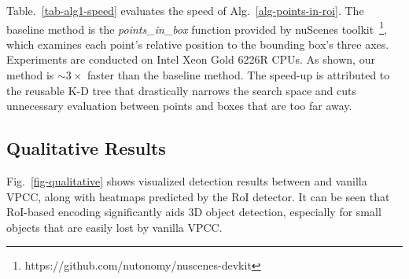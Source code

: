 Table.~\ref{tab-alg1-speed} evaluates the speed of Alg.~\ref{alg-points-in-roi}. 
The baseline method is the \textit{points\_in\_box} function provided by nuScenes 
toolkit~\footnote{https://github.com/nutonomy/nuscenes-devkit}, 
which examines each point's relative position to the bounding box's three axes.
Experiments are conducted on Intel Xeon Gold 6226R CPUs. As shown, our method is $\sim3\times$ faster than the baseline method. The speed-up is attributed to the reusable K-D tree that drastically narrows the search space and cuts unnecessary evaluation between points and boxes that are too far away.


\subsection{Qualitative Results}


Fig.~\ref{fig-qualitative} shows visualized detection results between \methodname{} and vanilla VPCC, along with heatmaps predicted by the RoI detector. It can be seen that RoI-based encoding significantly aids 3D object detection, especially for small objects that are easily lost by vanilla VPCC.

